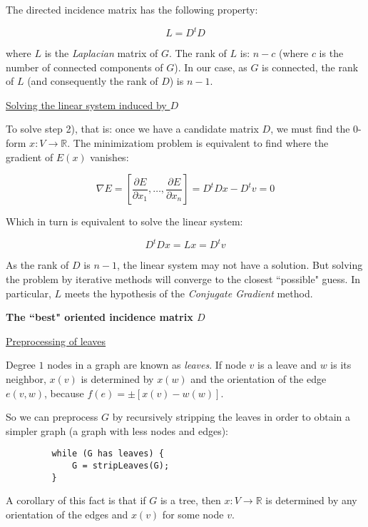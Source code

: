 \documentclass[a4paper,11pt]{article}
\begin{document}
The directed incidence matrix has the following property:

$$L = D^t D$$

where $L$ is the \textit{Laplacian} matrix of $G$. The rank of 
$L$ is: $n-c$ (where $c$ is the number of connected components of $G$). 
In our case, as $G$ is connected, the rank of $L$ (and consequently the 
rank of $D$) is $n-1$.

\bigskip

\underline{Solving the linear system induced by $D$}

\bigskip

To solve step 2), that is: once we have a candidate matrix $D$, we must 
find the 0-form $x: V \rightarrow \mathbb{R}$. The minimizatiom problem 
is equivalent to find where the gradient of $E(x)$ vanishes:
 
$$\nabla E = [\frac{\partial E}{\partial x_1}, \dots, \frac{\partial 
E}{\partial x_n}] = D^tDx-D^tv=0$$

Which in turn is equivalent to solve the linear system:

$$D^tDx = Lx = D^tv$$

As the rank of $D$ is $n-1$, the linear system may not have a solution. 
But solving the problem by iterative methods will converge to the 
closest ``possible" guess. In particular, $L$ meets the hypothesis of 
the \textit{Conjugate Gradient} method.

\bigskip

\textbf{The ``best" oriented incidence matrix $D$}

\bigskip

\underline{Preprocessing of leaves}

\bigskip

Degree $1$ nodes in a graph are known as \textit{leaves}. If node $v$ 
is a leave and $w$ is its neighbor, $x(v)$ is determined by $x(w)$ and 
the orientation of the edge $e(v,w)$, because $f(e) = \pm[x(v) - w(w)]$.

\bigskip

So we can preprocess $G$ by recursively stripping the leaves in order 
to obtain a simpler graph (a graph with less nodes and edges):

\bigskip

\begin{verbatim}
         while (G has leaves) {
             G = stripLeaves(G);
         }
\end{verbatim}

A corollary of this fact is that if $G$ is a tree, then $x: V 
\rightarrow \mathbb{R}$ is determined by any orientation of the edges 
and $x(v)$ for some node $v$.
\end{document}
